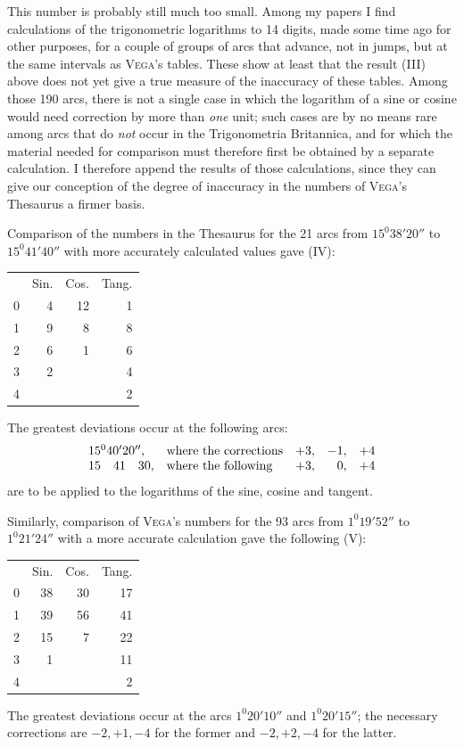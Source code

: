 This number is probably still much too small. Among my papers I find calculations of the trigonometric logarithms to 14 digits, made some time ago for other purposes, for a couple of groups of arcs that advance, not in jumps, but at the same intervals as \textsc{Vega}'s tables. These show at least that the result (III) above does not yet give a true measure of the inaccuracy of these tables. Among those 190 arcs, there is not a single case in which the logarithm of a sine or cosine would need correction by more than \textit{one} unit; such cases are by no means rare among arcs that do \textit{not} occur in the Trigonometria Britannica, and for which the material needed for comparison must therefore first be obtained by a separate calculation. I therefore append the results of those calculations, since they can give our conception of the degree of inaccuracy in the numbers of \textsc{Vega}'s Thesaurus a firmer basis.
\par
{}
Comparison of the numbers in the Thesaurus for the 21 arcs from $15^{0}38'20''$ to $15^{0}41'40''$ with more accurately calculated values gave (IV):
\begin{center}\begin{tabular}{r r r r}
& Sin. & Cos. & Tang.\\
0&4&12&1\\
1&9&8&8\\
2&6&1&6\\
3&2&&4\\
4&&&2
\end{tabular}\end{center}
The greatest deviations occur at the following arcs:
\[
\begin{array}{l l r r r}
15^{0}40'20'',&\text{where the corrections}&+3,&-1,&+4\\
15\quad41\quad30,&\text{where the following}&+3,&0,&+4
\end{array}
\]
are to be applied to the logarithms of the sine, cosine and tangent.

Similarly, comparison of \textsc{Vega}'s numbers for the 93 arcs from $1^{0}19'52''$ to $1^{0}21'24''$ with a more accurate calculation gave the following (V):
\begin{center}\begin{tabular}{r r r r}
& Sin. & Cos. & Tang.\\
0&38&30&17\\
1&39&56&41\\
2&15&7&22\\
3&1&&11\\
4&&&2
\end{tabular}\end{center}
The greatest deviations occur at the arcs $1^{0}20'10''$ and $1^{0}20'15''$; the necessary corrections are $-2,+1,-4$ for the former and $-2,+2,-4$ for the latter.

